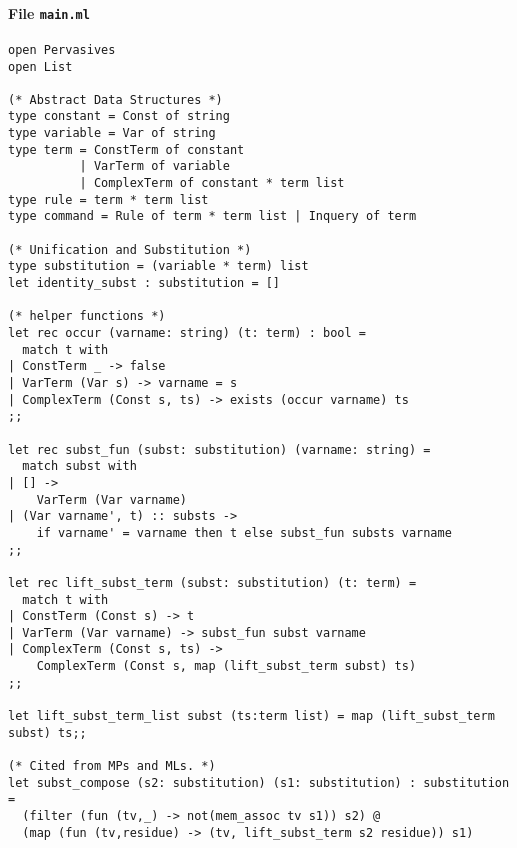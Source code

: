 \documentclass{article}
\begin{document}
\paragraph{File \tt main.ml}
\begin{verbatim}
open Pervasives
open List

(* Abstract Data Structures *)
type constant = Const of string                  
type variable = Var of string                 
type term = ConstTerm of constant 
          | VarTerm of variable 
          | ComplexTerm of constant * term list
type rule = term * term list
type command = Rule of term * term list | Inquery of term

(* Unification and Substitution *)
type substitution = (variable * term) list
let identity_subst : substitution = []

(* helper functions *)
let rec occur (varname: string) (t: term) : bool =
  match t with
| ConstTerm _ -> false
| VarTerm (Var s) -> varname = s
| ComplexTerm (Const s, ts) -> exists (occur varname) ts
;;

let rec subst_fun (subst: substitution) (varname: string) = 
  match subst with 
| [] -> 
    VarTerm (Var varname)
| (Var varname', t) :: substs -> 
    if varname' = varname then t else subst_fun substs varname
;;

let rec lift_subst_term (subst: substitution) (t: term) = 
  match t with 
| ConstTerm (Const s) -> t
| VarTerm (Var varname) -> subst_fun subst varname
| ComplexTerm (Const s, ts) -> 
    ComplexTerm (Const s, map (lift_subst_term subst) ts)
;;

let lift_subst_term_list subst (ts:term list) = map (lift_subst_term subst) ts;;

(* Cited from MPs and MLs. *)
let subst_compose (s2: substitution) (s1: substitution) : substitution =
  (filter (fun (tv,_) -> not(mem_assoc tv s1)) s2) @ 
  (map (fun (tv,residue) -> (tv, lift_subst_term s2 residue)) s1)


\end{verbatim}
\end{document}
